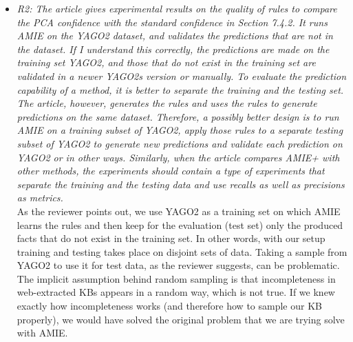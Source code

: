 \begin{figure*}[t!]
\begin{minipage}{.8\textwidth}
\begin{itemize}
      
      \item \textit{R2: The article gives experimental results on the quality of rules to compare the PCA confidence with the standard confidence in Section 7.4.2. 
      It runs AMIE on the YAGO2 dataset, and validates the predictions that are not in the dataset. If I understand this correctly, 
      the predictions are made on the training set YAGO2, and those that do not exist in the training set are validated in a newer YAGO2s version or manually. 
      To evaluate the prediction capability of a method, it is better to separate the training and the testing set.  
      The article, however, generates the rules and uses the rules to generate predictions on the same dataset. 
      Therefore, a possibly better design is to run AMIE on a training subset of YAGO2, apply those rules to a separate testing subset of YAGO2 to generate new predictions and 
      validate each prediction on YAGO2 or in other ways. Similarly, when the article compares AMIE+ with other methods, the experiments should contain a type 
      of experiments that separate the training and the testing data and use recalls as well as precisions as metrics. \\  }
      As the reviewer points out, we use YAGO2 as a training set on which AMIE learns the rules and then keep for the evaluation (test set) only the produced facts that do not exist in the training set.
      In other words, with our setup training and testing takes place on disjoint sets of data. 
      Taking a sample from YAGO2 to use it for test data, as the reviewer suggests, can be problematic. The implicit assumption behind random sampling is that incompleteness in 
      web-extracted KBs appears in a random way, which is not true. If we knew exactly how incompleteness works (and therefore how to sample our KB properly), we would have solved the original
      problem that we are trying solve with AMIE.
      
      
      \end{itemize}
\end{minipage}
\end{figure*}


